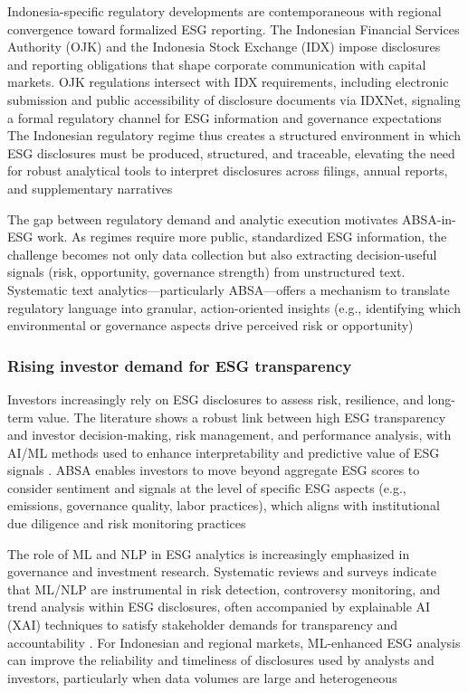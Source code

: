 Indonesia-specific regulatory developments are contemporaneous with regional convergence toward formalized ESG reporting. The Indonesian Financial Services Authority (OJK) and the Indonesia Stock Exchange (IDX) impose disclosures and reporting obligations that shape corporate communication with capital markets. OJK regulations intersect with IDX requirements, including electronic submission and public accessibility of disclosure documents via IDXNet, signaling a formal regulatory channel for ESG information and governance expectations \cite{10.22617/tcs210472-2} The Indonesian regulatory regime thus creates a structured environment in which ESG disclosures must be produced, structured, and traceable, elevating the need for robust analytical tools to interpret disclosures across filings, annual reports, and supplementary narratives \cite{10.22617/tcs210472-2}

The gap between regulatory demand and analytic execution motivates ABSA-in-ESG work. As regimes require more public, standardized ESG information, the challenge becomes not only data collection but also extracting decision-useful signals (risk, opportunity, governance strength) from unstructured text. Systematic text analytics—particularly ABSA—offers a mechanism to translate regulatory language into granular, action-oriented insights (e.g., identifying which environmental or governance aspects drive perceived risk or opportunity) \cite{10.1002/csr.70089,10.3390/su15054134,10.1108/mf-01-2023-0020}

\subsubsection{Rising investor demand for ESG transparency}
Investors increasingly rely on ESG disclosures to assess risk, resilience, and long-term value. The literature shows a robust link between high ESG transparency and investor decision-making, risk management, and performance analysis, with AI/ML methods used to enhance interpretability and predictive value of ESG signals \cite{10.69593/ajbais.v4i04.130,10.2139/ssrn.3738629,10.1108/mf-01-2023-0020,10.22617/tcs210472-2}. ABSA enables investors to move beyond aggregate ESG scores to consider sentiment and signals at the level of specific ESG aspects (e.g., emissions, governance quality, labor practices), which aligns with institutional due diligence and risk monitoring practices \cite{10.1002/csr.70089,10.69593/ajbais.v4i04.130,10.1108/mf-01-2023-0020}

The role of ML and NLP in ESG analytics is increasingly emphasized in governance and investment research. Systematic reviews and surveys indicate that ML/NLP are instrumental in risk detection, controversy monitoring, and trend analysis within ESG disclosures, often accompanied by explainable AI (XAI) techniques to satisfy stakeholder demands for transparency and accountability \cite{10.1002/csr.70089,10.2139/ssrn.3738629,10.1108/mf-01-2023-0020}. For Indonesian and regional markets, ML-enhanced ESG analysis can improve the reliability and timeliness of disclosures used by analysts and investors, particularly when data volumes are large and heterogeneous \cite{10.69593/ajbais.v4i04.130,10.1108/mf-01-2023-0020}

